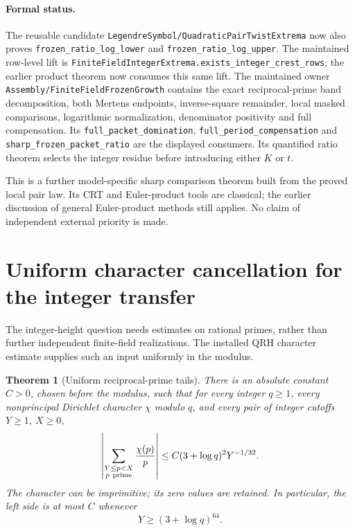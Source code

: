 \documentclass[11pt]{article}
\newtheorem{theorem}{Theorem}[section]
\begin{document}
\paragraph{Formal status.}
The reusable candidate
\texttt{LegendreSymbol/QuadraticPairTwistExtrema}
now also proves \texttt{frozen\_ratio\_log\_lower} and
\texttt{frozen\_ratio\_log\_upper}.
The maintained row-level lift is
\texttt{FiniteFieldIntegerExtrema.exists\_integer\_crest\_rows};
the earlier product theorem now consumes this same lift.
The maintained owner \texttt{Assembly/FiniteFieldFrozenGrowth}
contains the exact reciprocal-prime band decomposition, both Mertens
endpoints, inverse-square remainder, local masked comparisons,
logarithmic normalization, denominator positivity and full compensation.
Its \texttt{full\_packet\_domination},
\texttt{full\_period\_compensation} and
\texttt{sharp\_frozen\_packet\_ratio} are the displayed consumers.
Its quantified ratio theorem selects the integer residue before
introducing either \(K\) or \(t\).

This is a further model-specific sharp comparison theorem built from
the proved local pair law. Its CRT and Euler-product tools are
classical; the earlier discussion of general Euler-product methods
still applies. No claim of independent external priority is made.

\section{Uniform character cancellation for the integer transfer}
The integer-height question needs estimates on rational primes, rather
than further independent finite-field realizations. The installed QRH
character estimate supplies such an input uniformly in the modulus.

\begin{theorem}[Uniform reciprocal-prime tails]\label{thm:integer-character-harmonic-tail}
There is an absolute constant \(C>0\), chosen before the modulus, such that
for every integer \(q\geq1\), every nonprincipal Dirichlet character
\(\chi\) modulo \(q\), and every pair of integer cutoffs \(Y\geq1\), \(X\geq0\),
\[
 \left|\sum_{\substack{Y\leq p<X\\p\ {\rm prime}}}\frac{\chi(p)}p\right|
 \leq C(3+\log q)^2Y^{-1/32}.
\]
The character can be imprimitive; its zero values are retained. In particular,
the left side is at most \(C\) whenever
\[
                         Y\geq(3+\log q)^{64}.
\]
\end{theorem}
\end{document}
